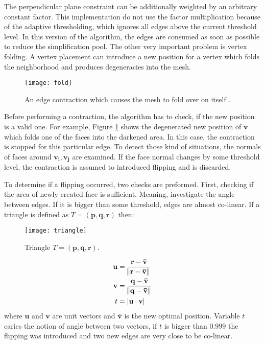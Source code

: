 The perpendicular plane constraint can be additionally weighted by an arbitrary constant factor. This implementation do not use the factor multiplication because of the adaptive thresholding, which ignores all edges above the current threshold level. In this version of the algorithm, the edges are consumed as soon as possible to reduce the simplification pool.
\newpage
The other very important problem is vertex folding. A vertex placement can introduce a new position for a vertex which folds the neighborhood and produces degeneracies into the mesh.

\begin{figure}[H]
  \begin{center}
    \texttt{[image: fold]}
    \caption{An edge contraction which causes the mesh to fold over on itself \cite{garland99}.}
    \label{fig:fold}
  \end{center}
\end{figure}

Before performing a contraction, the algorithm has to check, if the new position is a valid one. For example, Figure \ref{fig:fold} shows the degenerated new position of $\mathbf{\bar{v}}$ which folds one of the faces into the darkened area. In this case, the contraction is stopped for this particular edge. To detect those kind of situations, the normals of faces around $\mathbf{v_i}, \mathbf{v_j}$ are examined. If the face normal changes by some threshold level, the contraction is assumed to introduced flipping and is discarded. 

To determine if a flipping occurred, two checks are preformed. First, checking if the area of newly created face is sufficient. Meaning, investigate the angle between edges. If it is bigger than some threshold, edges are almost co-linear. If a triangle is defined as $T = (\mathbf{p}, \mathbf{q}, \mathbf{r})$ then:

\begin{figure}[H]
  \begin{center}
    \texttt{[image: triangle]}
    \caption{Triangle $T = (\mathbf{p}, \mathbf{q}, \mathbf{r})$.}
    \label{fig:gram}
  \end{center}
\end{figure}

\begin{align}
\mathbf{u} &= \frac{\mathbf{r} - \mathbf{\bar{v}}}{\norm{\mathbf{r} - \mathbf{\bar{v}}}}\\
\mathbf{v} &= \frac{\mathbf{q} - \mathbf{\bar{v}}}{\norm{\mathbf{q} - \mathbf{\bar{v}}}}\\
t &= |\mathbf{u} \cdot \mathbf{v}|
\end{align}
where $\mathbf{u}$ and $\mathbf{v}$ are unit vectors and $\mathbf{\bar{v}}$ is the new optimal position. Variable $t$ caries the notion of angle between two vectors, if $t$ is bigger than $0.999$ the flipping was introduced and two new edges are very close to be co-linear.

